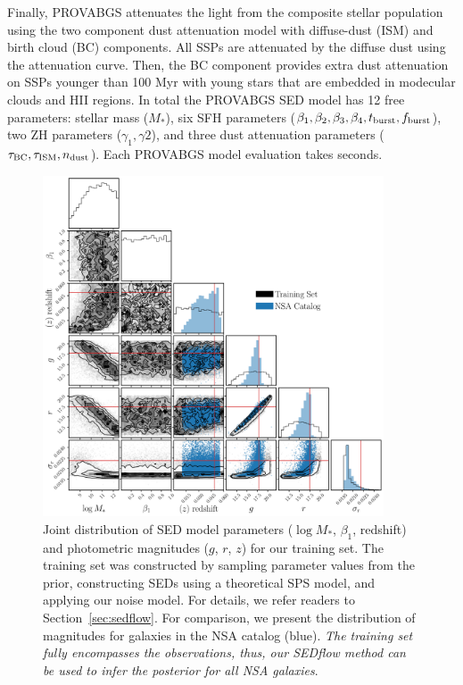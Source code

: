 Finally, PROVABGS attenuates the light from the composite stellar population
using the two component \cite{charlot2000} dust attenuation model with
diffuse-dust (ISM) and birth cloud (BC) components. 
All SSPs are attenuated by the diffuse dust using the \cite{kriek2013}
attenuation curve.
Then, the BC component provides extra dust attenuation on SSPs younger than 100
Myr with young stars that are embedded in modecular clouds and HII regions. 
In total the PROVABGS SED model has 12 free parameters: stellar mass ($M_*$),
six SFH parameters ($\beta_1, \beta_2, \beta_3, \beta_4, t_{\rm burst}, f_{\rm
burst}$), two ZH parameters ($\gamma_1, \gamma2$), and three dust attenuation
parameters ($\tau_{\rm BC}, \tau_{\rm ISM}, n_{\rm dust}$). 
Each PROVABGS model evaluation takes  seconds. 


\begin{figure}
\begin{center}
\includegraphics[width=0.9\textwidth]{figs/training.pdf}
    \caption{\label{fig:data}
    Joint distribution of SED model parameters ($\log M_*$, $\beta_1$,
    redshift) and photometric magnitudes ($g$, $r$, $z$) for our training set.
    The training set was constructed by sampling parameter values from the
    prior, constructing SEDs using a theoretical SPS
    model, and applying our noise model. 
    For details, we refer readers to Section~\ref{sec:sedflow}.
    For comparison, we present the distribution of magnitudes for galaxies in
    the NSA catalog (blue). 
    \emph{The training set fully encompasses the observations, thus, our 
    {\sc SEDflow} method can be used to infer the posterior for all NSA
    galaxies}.
    }
\end{center}
\end{figure}
